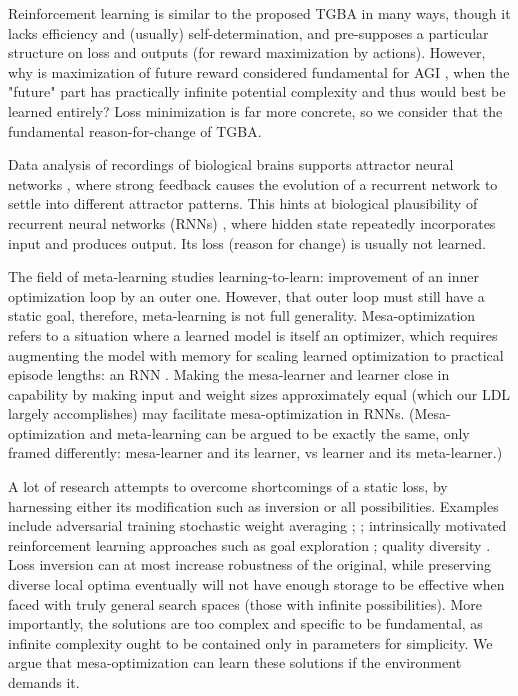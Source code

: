 \documentclass{article}
\begin{document}
Reinforcement learning is similar to the proposed TGBA in many ways, though it lacks efficiency and (usually) self-determination, and pre-supposes a particular structure on loss and outputs (for reward maximization by actions). However, why is maximization of future reward considered fundamental for AGI \cite{SILVER2021103535}, when the "future" part has practically infinite potential complexity and thus would best be learned entirely? Loss minimization is far more concrete, so we consider that the fundamental reason-for-change of TGBA.

Data analysis of recordings of biological brains supports attractor neural networks \cite{AMIT1990111}, where strong feedback causes the evolution of a recurrent network to settle into different attractor patterns. This hints at biological plausibility of recurrent neural networks (RNNs) \cite{1986Natur.323.533R}, where hidden state repeatedly incorporates input and produces output. Its loss (reason for change) is usually not learned.

The field of meta-learning studies learning-to-learn: improvement of an inner optimization loop by an outer one. However, that outer loop must still have a static goal, therefore, meta-learning is not full generality. Mesa-optimization \cite{hubinger2019risks} refers to a situation where a learned model is itself an optimizer, which requires augmenting the model with memory for scaling learned optimization to practical episode lengths: an RNN \cite{Ravi2017OptimizationAA}. Making the mesa-learner and learner close in capability by making input and weight sizes approximately equal (which our LDL largely accomplishes) may facilitate mesa-optimization in RNNs. (Mesa-optimization and meta-learning can be argued to be exactly the same, only framed differently: mesa-learner and its learner, vs learner and its meta-learner.)

A lot of research attempts to overcome shortcomings of a static loss, by harnessing either its modification such as inversion or all possibilities. Examples include adversarial training stochastic weight averaging \cite{izmailov2019averaging}; \cite{goodfellow2015explaining} \cite{du2021understanding}; intrinsically motivated reinforcement learning approaches \cite{6294131} such as goal exploration \cite{DBLP:journals/corr/abs-1708-02190}; quality diversity \cite{meyerson2017discovering} \cite{Gravina_2019} \cite{parkerholder2020effective}. Loss inversion can at most increase robustness of the original, while preserving diverse local optima eventually will not have enough storage to be effective when faced with truly general search spaces (those with infinite possibilities). More importantly, the solutions are too complex and specific to be fundamental, as infinite complexity ought to be contained only in parameters for simplicity. We argue that mesa-optimization can learn these solutions if the environment demands it.
\end{document}
